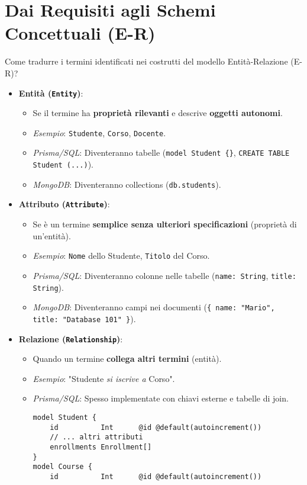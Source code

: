 	\section{Dai Requisiti agli Schemi Concettuali (E-R)}
	Come tradurre i termini identificati nei costrutti del modello Entità-Relazione (E-R)?
	\begin{itemize}
		\item \textbf{Entità (\texttt{Entity})}:
		\begin{itemize}
			\item Se il termine ha \textbf{proprietà rilevanti} e descrive \textbf{oggetti autonomi}.
			\item \textit{Esempio}: \texttt{Studente}, \texttt{Corso}, \texttt{Docente}.
			\item \textit{Prisma/SQL}: Diventeranno tabelle (\texttt{model Student \{\}}, \texttt{CREATE TABLE Student (...)}).
			\item \textit{MongoDB}: Diventeranno collections (\texttt{db.students}).
		\end{itemize}
		\item \textbf{Attributo (\texttt{Attribute})}:
		\begin{itemize}
			\item Se è un termine \textbf{semplice senza ulteriori specificazioni} (proprietà di un'entità).
			\item \textit{Esempio}: \texttt{Nome} dello Studente, \texttt{Titolo} del Corso.
			\item \textit{Prisma/SQL}: Diventeranno colonne nelle tabelle (\texttt{name: String}, \texttt{title: String}).
			\item \textit{MongoDB}: Diventeranno campi nei documenti (\texttt{\{ name: "Mario", title: "Database 101" \}}).
		\end{itemize}
		\item \textbf{Relazione (\texttt{Relationship})}:
		\begin{itemize}
			\item Quando un termine \textbf{collega altri termini} (entità).
			\item \textit{Esempio}: "Studente \textit{si iscrive a} Corso".
			\item \textit{Prisma/SQL}: Spesso implementate con chiavi esterne e tabelle di join.
			\begin{verbatim}
model Student {
	id          Int      @id @default(autoincrement())
	// ... altri attributi
	enrollments Enrollment[]
}
model Course {
	id          Int      @id @default(autoincrement())

\end{verbatim}
\end{itemize}
\end{itemize}
